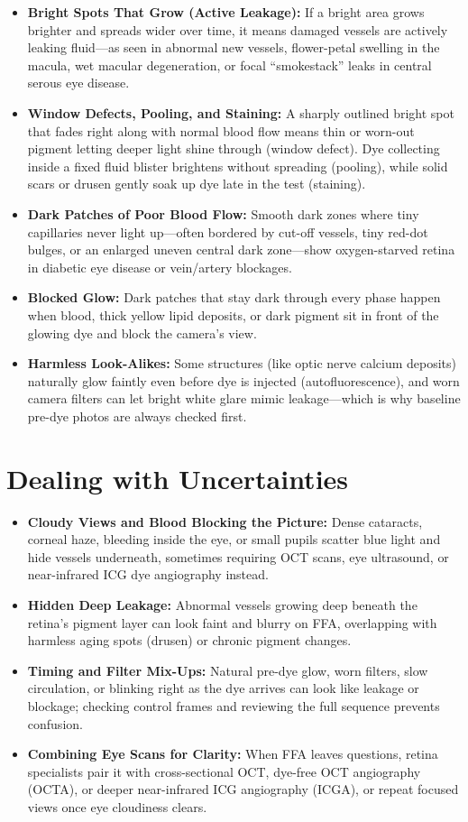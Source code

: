\begin{itemize}
    \item \textbf{Bright Spots That Grow (Active Leakage):} If a bright area grows brighter and spreads wider over time, it means damaged vessels are actively leaking fluid---as seen in abnormal new vessels, flower-petal swelling in the macula, wet macular degeneration, or focal ``smokestack'' leaks in central serous eye disease.
    \item \textbf{Window Defects, Pooling, and Staining:} A sharply outlined bright spot that fades right along with normal blood flow means thin or worn-out pigment letting deeper light shine through (window defect). Dye collecting inside a fixed fluid blister brightens without spreading (pooling), while solid scars or drusen gently soak up dye late in the test (staining).
    \item \textbf{Dark Patches of Poor Blood Flow:} Smooth dark zones where tiny capillaries never light up---often bordered by cut-off vessels, tiny red-dot bulges, or an enlarged uneven central dark zone---show oxygen-starved retina in diabetic eye disease or vein/artery blockages.
    \item \textbf{Blocked Glow:} Dark patches that stay dark through every phase happen when blood, thick yellow lipid deposits, or dark pigment sit in front of the glowing dye and block the camera's view.
    \item \textbf{Harmless Look-Alikes:} Some structures (like optic nerve calcium deposits) naturally glow faintly even before dye is injected (autofluorescence), and worn camera filters can let bright white glare mimic leakage---which is why baseline pre-dye photos are always checked first.
\end{itemize}

\section{Dealing with Uncertainties}

\begin{itemize}
    \item \textbf{Cloudy Views and Blood Blocking the Picture:} Dense cataracts, corneal haze, bleeding inside the eye, or small pupils scatter blue light and hide vessels underneath, sometimes requiring OCT scans, eye ultrasound, or near-infrared ICG dye angiography instead.
    \item \textbf{Hidden Deep Leakage:} Abnormal vessels growing deep beneath the retina's pigment layer can look faint and blurry on FFA, overlapping with harmless aging spots (drusen) or chronic pigment changes.
    \item \textbf{Timing and Filter Mix-Ups:} Natural pre-dye glow, worn filters, slow circulation, or blinking right as the dye arrives can look like leakage or blockage; checking control frames and reviewing the full sequence prevents confusion.
    \item \textbf{Combining Eye Scans for Clarity:} When FFA leaves questions, retina specialists pair it with cross-sectional OCT, dye-free OCT angiography (OCTA), or deeper near-infrared ICG angiography (ICGA), or repeat focused views once eye cloudiness clears.
\end{itemize}

